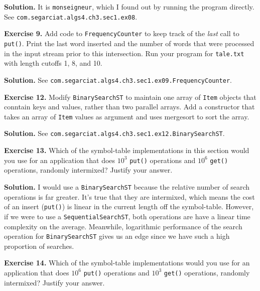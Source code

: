 \documentclass[12pt, a4paper]{article}
\newenvironment{ex}[2][Exercise]
{\par\medskip\noindent \textbf{#1 #2.}}
{\medskip}
\newenvironment{sol}[1][Solution]
{\par\medskip\noindent \textbf{#1.} }
{\medskip}
\begin{document}
	\begin{sol}
		It is \texttt{monseigneur}, which I found out by running the program
		directly. See \texttt{com.segarciat.algs4.ch3.sec1.ex08}.
	\end{sol}
	\begin{ex}{9}
		Add code to \texttt{FrequencyCounter} to keep track of the \emph{last} call to
		\texttt{put()}. Print the last word inserted and the number of words that
		were processed in the input stream prior to this intersection. Run your program
		for \texttt{tale.txt} with length cutoffs 1, 8, and 10.
	\end{ex}
	\begin{sol}
		See \texttt{com.segarciat.algs4.ch3.sec1.ex09.FrequencyCounter}.
	\end{sol}
	\begin{ex}{12}
		Modify \texttt{BinarySearchST} to maintain one array of \texttt{Item} objects that
		conntain keys and values, rather than two parallel arrays. Add a constructor that
		takes an array of \texttt{Item} values as argument and uses mergesort to sort the array.
	\end{ex}
	\begin{sol}
		See \texttt{com.segarciat.algs4.ch3.sec1.ex12.BinarySearchST}.
	\end{sol}
	\begin{ex}{13}
		Which of the symbol-table implementations in this section would you use for an
		application that does $10^3$ \texttt{put()} operations and $10^6$ \texttt{get()}
		operations, randomly intermixed? Justify your answer.
	\end{ex}
	\begin{sol}
		I would use a \texttt{BinarySearchST} because the relative number of search
		operations is far greater. It's true that they are intermixed, which means
		the cost of an insert (\texttt{put()}) is linear in the current length
		off the symbol-table. However, if we were to use a \texttt{SequentialSearchST},
		both operations are have a linear time complexity on the average. Meanwhile,
		logarithmic performance of the search operation for \texttt{BinarySearchST}
		gives us an edge since we have such a high proportion of searches.
	\end{sol}
	\begin{ex}{14}
		Which of the symbol-table implementations would you use for an application that
		does $10^6$ \texttt{put()} operations and $10^3$ \texttt{get()} operations, randomly
		intermixed? Justify your answer.
	\end{ex}
\end{document}
